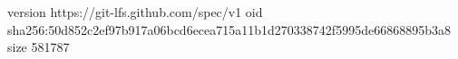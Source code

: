 version https://git-lfs.github.com/spec/v1
oid sha256:50d852c2ef97b917a06bcd6ecea715a11b1d270338742f5995de66868895b3a8
size 581787
